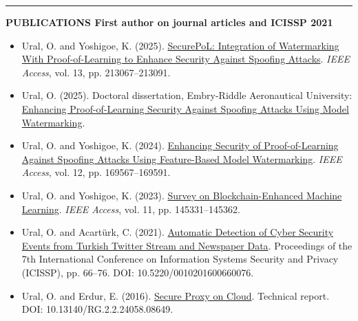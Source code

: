 \documentclass[10pt,a4paper]{article}
\newcommand{\spacedhrule}[2]{\vspace{#1}\hrule\vspace{#2}}
\newcommand{\roottitle}[1]{\par{\large\textbf{#1}}\par\vspace{0.2em}}
\begin{document}
\vspace{0.2cm}


\spacedhrule{0.6em}{0.1em}

\roottitle{PUBLICATIONS \hfill {\normalfont\footnotesize\color{light}First author on journal articles and ICISSP 2021}}

\begin{itemize}
  \item Ural, O. and Yoshigoe, K. (2025). \href{https://ieeexplore.ieee.org/document/11293969}{SecurePoL: Integration of Watermarking With Proof-of-Learning to Enhance Security Against Spoofing Attacks}. \textit{IEEE Access}, vol. 13, pp. 213067--213091.

  \item Ural, O. (2025). Doctoral dissertation, Embry-Riddle Aeronautical University: \href{https://commons.erau.edu/edt/905/}{Enhancing Proof-of-Learning Security Against Spoofing Attacks Using Model Watermarking}.

  \item Ural, O. and Yoshigoe, K. (2024). \href{https://ieeexplore.ieee.org/abstract/document/10741282}{Enhancing Security of Proof-of-Learning Against Spoofing Attacks Using Feature-Based Model Watermarking}. \textit{IEEE Access}, vol. 12, pp. 169567--169591.

  \item Ural, O. and Yoshigoe, K. (2023). \href{https://doi.org/10.1109/ACCESS.2023.3344669}{Survey on Blockchain-Enhanced Machine Learning}. \textit{IEEE Access}, vol. 11, pp. 145331--145362.

  \item Ural, O. and Acart\"urk, C. (2021). \href{https://www.scitepress.org/Papers/2021/102016/102016.pdf}{Automatic Detection of Cyber Security Events from Turkish Twitter Stream and Newspaper Data}. Proceedings of the 7th International Conference on Information Systems Security and Privacy (ICISSP), pp. 66--76. DOI: 10.5220/0010201600660076.

  \item Ural, O. and Erdur, E. (2016). \href{https://doi.org/10.13140/RG.2.2.24058.08649}{Secure Proxy on Cloud}. Technical report. DOI: 10.13140/RG.2.2.24058.08649.

\end{itemize}
\end{document}
